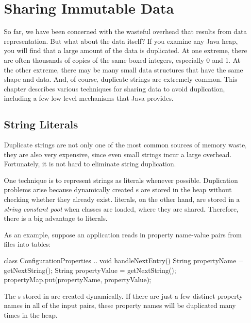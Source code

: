 \chapter{Sharing Immutable Data}
\label{chapter:sharing-immutable-data}

So far, we have been concerned with the wasteful overhead that results from
data representation. But what about the data itself? If you examine any Java
heap, you will find that a
large amount of the data is duplicated. At one extreme, 
there are often thousands of copies of the same boxed
integers, especially 0 and 1. At the other extreme, there may be many
 small data
structures that have the same shape and data. 
And, of course, duplicate strings are extremely common.
This chapter describes various
techniques for sharing data to avoid
duplication, including a few low-level mechanisms that Java provides.

\section{String Literals}
\label{sec:literals}

Duplicate strings are not only one of the
most common sources of memory waste, they are also very expensive, since even
small strings incur a large overhead. Fortunately, it is not
hard to eliminate string duplication. 

 One technique is to represent strings as  
literals whenever possible. Duplication problems arise because dynamically
 created s
are stored in the heap without checking whether they already
exist.  literals, on the other hand, are stored in a
\emph{string constant pool} when classes
are loaded, where they are shared. Therefore, there is a big advantage to
 literals.

 As an example, suppose an application
reads in property name-value pairs from files into tables:
\begin{shortlisting}
class ConfigurationProperties {
    ..
	void handleNextEntry() {
		String propertyName = getNextString();
		String propertyValue = getNextString();
		propertyMap.put(propertyName, propertyValue);
	}
}
\end{shortlisting}
The s stored in  are created dynamically. If 
there are just a few distinct property names in all of the input pairs, these
property names will be duplicated many times in the heap.

